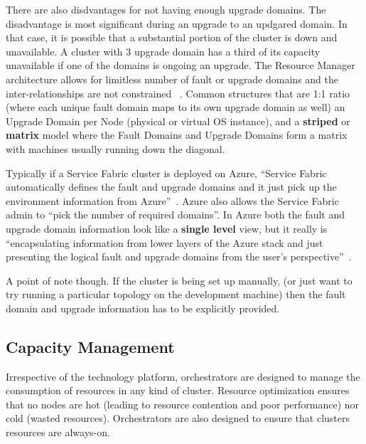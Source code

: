 There are also disdvantages for not having enough upgrade domains.
The disadvantage is most significant during an upgrade to an updgared
domain. In that case, it is possible that a substantial portion
of the cluster is down and unavailable. A cluster with 3 upgrade domain 
has a third of its
capacity unavailable if one of the domains is ongoing an upgrade. 
The Resource Manager architecture allows for limitless number of fault or 
upgrade domains
and the inter-relationships are not constrained
~\cite{hid-sp18-501-description}. Common structures that 
are 1:1 ratio (where each
unique fault domain maps to its own upgrade domain as well) an Upgrade
Domain per Node (physical or virtual OS instance), and a {\bf striped} or
{\bf matrix} model where the Fault Domains and Upgrade Domains form a
matrix with machines usually running down the diagonal.

Typically if a Service Fabric cluster is deployed on Azure, 
``Service Fabric
automatically defines the fault and upgrade domains and it 
just pick up the environment information from
Azure''~\cite{hid-sp18-501-description}. Azure also allows the 
Service Fabric admin
to ``pick the number of required domains''. In Azure both the fault and
upgrade domain information look like a {\bf single level} view, but it
really is ``encapsulating information from lower layers of the Azure
stack and just presenting the logical fault and upgrade domains from
the user's perspective''~\cite{hid-sp18-501-fig2and3}.

A point of note though. If the cluster is being set up manually, (or
just want to try running a particular topology on the development
machine) then the fault domain and upgrade information has to be
explicitly provided.

\subsection{Capacity Management}
Irrespective of the technology platform, orchestrators are designed to
manage the consumption of resources in any kind of cluster. Resource
optimization ensures that no nodes are hot (leading to resource
contention and poor performance) nor cold (wasted
resources). Orchestrators are also designed to ensure that clusters
resources are always-on.


